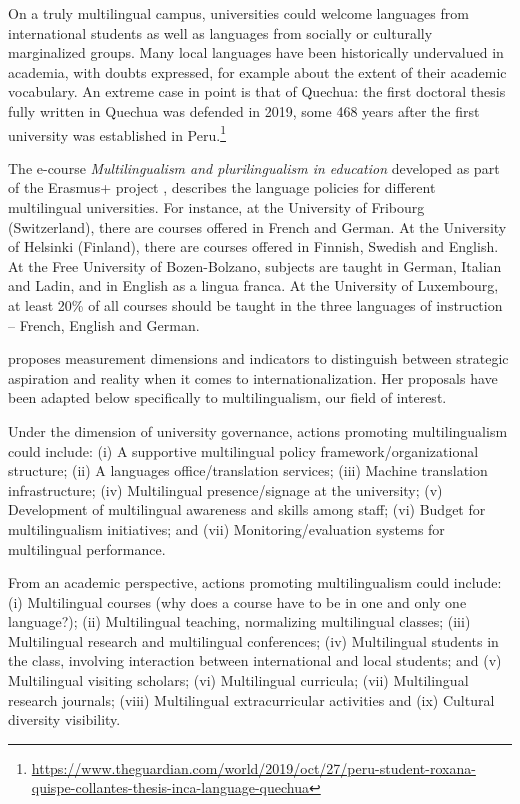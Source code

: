 \documentclass[output=paper]{langscibook}
\begin{document}
On a truly multilingual campus, universities could welcome languages from international students as well as languages from socially or culturally marginalized groups. Many local languages have been historically undervalued in academia, with doubts expressed, for example about the extent of their academic vocabulary. An extreme case in point is that of Quechua: the first doctoral thesis fully written in Quechua was defended in 2019, some 468 years after the first university was established in Peru.\footnote{\url{https://www.theguardian.com/world/2019/oct/27/peru-student-roxana-quispe-collantes-thesis-inca-language-quechua}}

The e-course \textit{Multilingualism and plurilingualism in education} developed as part of the Erasmus+ project \citet{MultilingualHigherEducation2016}, describes the language policies for different multilingual universities. For instance, at the University of Fribourg (Switzerland), there are courses offered in French and German. At the University of Helsinki (Finland), there are courses offered in Finnish, Swedish and English. At the Free University of Bozen-Bolzano, subjects are taught in German, Italian and Ladin, and in English as a lingua franca. At the University of Luxembourg, at least 20\% of all courses should be taught in the three languages of instruction – French, English and German. 


\citet[89]{Gao2019} proposes measurement dimensions and indicators to distinguish between strategic aspiration and reality when it comes to internationalization. Her proposals have been adapted below specifically to multilingualism, our field of interest.

Under the dimension of university governance, actions promoting multilingualism could include:
(i) A supportive multilingual policy framework/organiza\-tion\-al structure;
(ii) A languages office/translation services;
(iii) Machine translation infrastructure;
(iv) Multilingual presence/signage at the university;
(v) Development of multilingual awareness and skills among staff;
(vi) Budget for multilingualism initiatives; and
(vii) Monitoring/evaluation systems for multilingual performance.

From an academic perspective, actions promoting multilingualism could include:
(i) Multilingual courses (why does a course have to be in one and only one language?);
(ii) Multilingual teaching, normalizing multilingual classes;
(iii) Multilingual research and multilingual conferences;
(iv) Multilingual students in the class, involving interaction between international and local students; and
(v) Multilingual visiting scholars;
(vi) Multilingual curricula;
(vii) Multilingual research journals;
(viii) Multilingual extracurricular activities and
(ix) Cultural diversity visibility.
\end{document}
